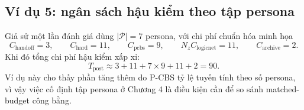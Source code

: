 \documentclass[oneside,a4paper,12pt]{extreport}
\begin{document}
\subsection{Ví dụ 5: ngân sách hậu kiểm theo tập persona}
Giả sử một lần đánh giá dùng $|\mathcal{P}|=7$ persona, với chi phí chuẩn hóa minh họa
\begin{equation}
C_{\text{handoff}}=3,\qquad C_{\text{hard}}=11,\qquad C_{\text{pcbs}}=9,\qquad N_zC_{\text{logicnet}}=11,\qquad C_{\text{archive}}=2.
\end{equation}
Khi đó tổng chi phí hậu kiểm xấp xỉ:
\begin{equation}
T_{\text{post}}\approx 3+11+7\times 9+11+2=90.
\end{equation}
Ví dụ này cho thấy phần tăng thêm do P-CBS tỷ lệ tuyến tính theo số persona, vì vậy việc cố định tập persona ở Chương 4 là điều kiện cần để so sánh matched-budget công bằng.
\end{document}
